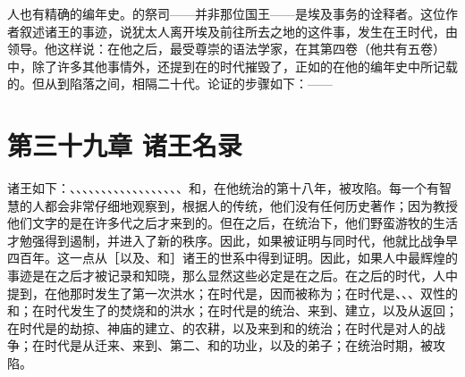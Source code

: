 人也有精确的编年史。的祭司——并非那位国王——是埃及事务的诠释者。这位作者叙述诸王的事迹，说犹太人离开埃及前往所去之地的这件事，发生在王时代，由领导。他这样说：在他之后，最受尊崇的语法学家，在其第四卷（他共有五卷）中，除了许多其他事情外，还提到在的时代摧毁了，正如的在他的编年史中所记载的。但从到陷落之间，相隔二十代。论证的步骤如下：——\par


\section{第三十九章 诸王名录}

诸王如下：、、、、、、、、、、、、、、、、、、和，在他统治的第十八年，被攻陷。每一个有智慧的人都会非常仔细地观察到，根据人的传统，他们没有任何历史著作；因为教授他们文字的是在许多代之后才来到的。但在之后，在统治下，他们野蛮游牧的生活才勉强得到遏制，并进入了新的秩序。因此，如果被证明与同时代，他就比战争早四百年。这一点从［以及、和］诸王的世系中得到证明。因此，如果人中最辉煌的事迹是在之后才被记录和知晓，那么显然这些必定是在之后。在之后的时代，人中提到，在他那时发生了第一次洪水；在时代是，因而被称为；在时代是、、、双性的和；在时代发生了的焚烧和的洪水；在时代是的统治、来到、建立，以及从返回；在时代是的劫掠、神庙的建立、的农耕，以及来到和的统治；在时代是对人的战争；在时代是从迁来、来到、第二、和的功业，以及的弟子；在统治时期，被攻陷。\par


